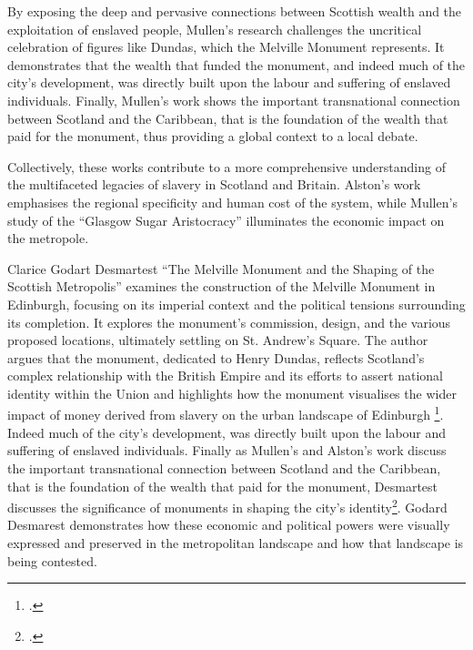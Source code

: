 \documentclass{scrartcl}
\begin{document}
By exposing the deep and pervasive connections between Scottish wealth and the exploitation of enslaved people, Mullen's research challenges the uncritical celebration of figures like Dundas, which the Melville Monument represents. It demonstrates that the wealth that funded the monument, and indeed much of the city's development, was directly built upon the labour and suffering of enslaved individuals. Finally, Mullen’s work shows the important transnational connection between Scotland and the Caribbean, that is the foundation of the wealth that paid for the monument, thus providing a global context to a local debate.

Collectively, these works contribute to a more comprehensive understanding of the multifaceted legacies of slavery in Scotland and Britain.
Alston's work emphasises the regional specificity and human cost of the system, while Mullen's  study of the ``Glasgow Sugar Aristocracy'' illuminates the economic impact on the metropole.

Clarice Godart Desmartest “The Melville Monument and the Shaping of the Scottish Metropolis” examines the construction of the Melville Monument in Edinburgh, focusing on its imperial context and the political tensions surrounding its completion. It explores the monument's commission, design, and the various proposed locations, ultimately settling on St. Andrew's Square. The author argues that the monument, dedicated to Henry Dundas, reflects Scotland's complex relationship with the British Empire and its efforts to assert national identity within the Union and highlights how the monument visualises the wider impact of money derived from slavery on the urban landscape of Edinburgh \footcite[``For Scottish moneyed elites, whose role expanded under the Dundas regime, raising subscriptions to monuments was a way of celebrating their own cultural and national participation in (as they saw it) a heroic age of progress and recognising the advantages they gained under the Union of 1707''][p.124]{godard_2018}. Indeed much of the city's development, was directly built upon the labour and suffering of enslaved individuals. Finally as Mullen’s and Alston’s work discuss the important transnational connection between Scotland and the Caribbean, that is the foundation of the wealth that paid for the monument, Desmartest discusses the significance of monuments in shaping the city's identity\footcite[``The statue of Dundas standing aloof on the column mirrors the career of a politician in whose hands patronage for Scotland was concentrated. It tells the story of Britain’s success and belief in its own supremacy, as well as Scotland’s strengthened place in the British empire, which then encompassed almost a quarter of the world’s population. 
''][p.126]{godard_2018}. Godard Desmarest demonstrates how these economic and political powers were visually expressed and preserved in the metropolitan landscape and how that landscape is being contested. 
\end{document}
